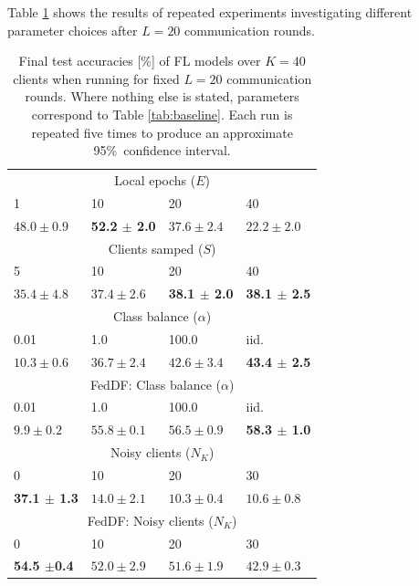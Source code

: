 \documentclass{article}
\begin{document}
Table \ref{tab:main} shows the results of repeated experiments investigating different parameter choices after $L=20$ communication rounds.
\begin{table}[htb!]
    \centering
    \begin{tabular}{llll}
       \hline
        \multicolumn{4}{c}{Local epochs ($E$)}\\
        1 & 10 & 20 & 40 \\
       \hline
$48.0 \pm 0.9$ & \textbf{ 52.2 $\pm$ 2.0 } & $37.6 \pm 2.4$ & $22.2 \pm 2.0$ \\
        \multicolumn{4}{c}{Clients samped ($S$)}\\
        5 & 10 & 20 & 40 \\
       \hline
        $35.4 \pm 4.8$ & $37.4 \pm 2.6$ & \textbf{ 38.1 $\pm$ 2.0 } & \textbf{ 38.1 $\pm$ 2.5 } \\
        \multicolumn{4}{c}{Class balance ($\alpha$)}\\
        0.01 & 1.0 & 100.0 & iid. \\
       \hline
        $10.3 \pm 0.6$ & $36.7 \pm 2.4$ & $42.6 \pm 3.4$ & \textbf{ 43.4 $\pm$ 2.5  }\\
        \multicolumn{4}{c}{FedDF: Class balance ($\alpha$)}\\
        0.01 & 1.0 & 100.0 & iid. \\
       \hline
        $9.9 \pm 0.2$ & $55.8 \pm 0.1$ & $56.5 \pm 0.9$ & \textbf{ 58.3 $\pm$ 1.0 } \\
        \multicolumn{4}{c}{Noisy clients ($N_K$)}\\
        0 & 10 & 20 & 30 \\
       \hline
        \textbf{ 37.1 $\pm$ 1.3 } & $14.0 \pm 2.1$ & $10.3 \pm 0.4$ & $10.6 \pm 0.8$ \\
        \multicolumn{4}{c}{FedDF: Noisy clients ($N_K$)}\\
        0 & 10 & 20 & 30 \\
       \hline
        \textbf{ 54.5 $\pm $0.4 } & $52.0 \pm 2.9$ & $51.6 \pm 1.9$ & $42.9 \pm 0.3$ \\
\end{tabular}
    \caption{
    Final test accuracies [\%] of FL models over $K=40$ clients when running for fixed $L=20$ communication rounds.
    Where nothing else is stated, parameters correspond to Table \ref{tab:baseline}.
    Each run is repeated five times to produce an approximate 95\%\ confidence interval.
    }
    \label{tab:main}
\end{table}
\end{document}
